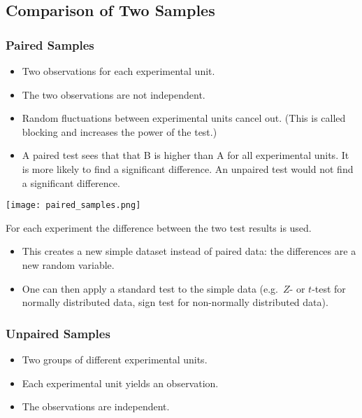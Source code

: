 \subsection{Comparison of Two Samples}


\subsubsection{Paired Samples}

\begin{itemize}
    \item Two observations for each experimental unit.
    \item The two observations are not independent.
    \item Random fluctuations between experimental units cancel out. (This is called blocking and increases the power of the test.)
    \item A paired test sees that that B is higher than A for all experimental units. It is more likely to find a significant difference. An unpaired test would not find a significant difference.
\end{itemize}

\begin{center}
    \texttt{[image: paired\_samples.png]}
\end{center}

\newpar{}

For each experiment the difference between the two test results is used.
\begin{itemize}
    \item This creates a new simple dataset instead of paired data: the differences are a new random variable.
    \item One can then apply a standard test to the simple data (e.g.\ $Z$- or $t$-test for normally distributed data, sign test for non-normally distributed data).
\end{itemize}

\subsubsection{Unpaired Samples}

\begin{itemize}
    \item Two groups of different experimental units.
    \item Each experimental unit yields an observation.
    \item The observations are independent.
\end{itemize}

